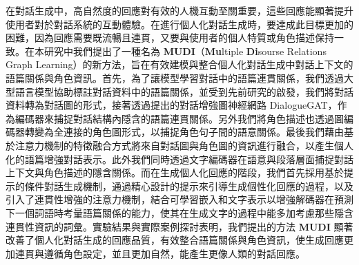 \StartAbstractChi
在對話生成中，高自然度的回應對有效的人機互動至關重要，這些回應能顯著提升使用者對於對話系統的互動體驗。在進行個人化對話生成時，要達成此目標更加的困難，因為回應需要既流暢且連貫，又要與使用者的個人特質或角色描述保持一致。在本研究中我們提出了一種名為 \textbf{MUDI}（\textbf{Mu}ltiple \textbf{Di}sourse Relations Graph Learning）的新方法，旨在有效建模與整合個人化對話生成中對話上下文的語篇關係與角色資訊。首先，為了讓模型學習對話中的語篇連貫關係，我們透過大型語言模型協助標註對話資料中的語篇關係，並受到先前研究的啟發，我們將對話資料轉為對話圖的形式，接著透過提出的對話增強圖神經網路 DialogueGAT，作為編碼器來捕捉對話結構內隱含的語篇連貫關係。另外我們將角色描述也透過圖編碼器轉變為全連接的角色圖形式，以捕捉角色句子間的語意關係。最後我們藉由基於注意力機制的特徵融合方式將來自對話圖與角色圖的資訊進行融合，以產生個人化的語篇增強對話表示。此外我們同時透過文字編碼器在語意與段落層面捕捉對話上下文與角色描述的隱含關係。而在生成個人化回應的階段，我們首先採用基於提示的條件對話生成機制，通過精心設計的提示來引導生成個性化回應的過程，以及引入了連貫性增強的注意力機制，結合可學習嵌入和文字表示以增強解碼器在預測下一個詞語時考量語篇關係的能力，使其在生成文字的過程中能多加考慮那些隱含連貫性資訊的詞彙。實驗結果與實際案例探討表明，我們提出的方法 \textbf{MUDI} 顯著改善了個人化對話生成的回應品質，有效整合語篇關係與角色資訊，使生成回應更加連貫與遵循角色設定，並且更加自然，能產生更像人類的對話回應。

\EndAbstractChi
